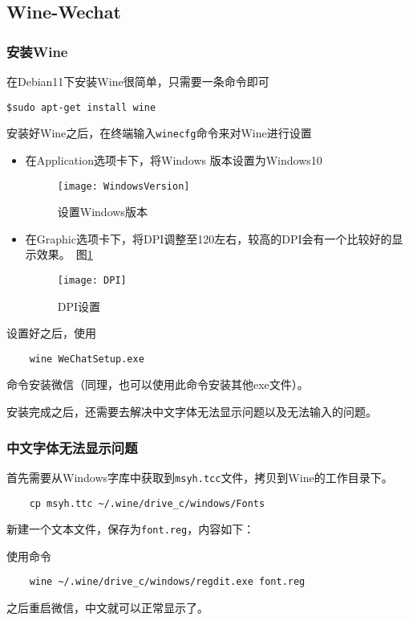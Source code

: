 \subsection{Wine-Wechat}
\subsubsection{安装Wine}
在Debian11下安装Wine很简单，只需要一条命令即可
\begin{lstlisting}
$sudo apt-get install wine
\end{lstlisting}

安装好Wine之后，在终端输入\lstinline|winecfg|命令来对Wine进行设置
\begin{itemize}
	\item 在Application选项卡下，将Windows 版本设置为Windows10
	\begin{figure}[htbp]
		\centering
		\texttt{[image: WindowsVersion]}
		\caption{设置Windows版本}
	\end{figure}
	\item 在Graphic选项卡下，将DPI调整至120左右，较高的DPI会有一个比较好的显示效果。~图\ref{dpi}
	\begin{figure}[htbp]
		\centering
		\texttt{[image: DPI]}
		\caption{DPI设置}\label{dpi}
	\end{figure}
\end{itemize}

设置好之后，使用
\begin{lstlisting}
	wine WeChatSetup.exe
\end{lstlisting}
命令安装微信（同理，也可以使用此命令安装其他exe文件）。

安装完成之后，还需要去解决中文字体无法显示问题以及无法输入的问题。

\subsubsection{中文字体无法显示问题}
首先需要从Windows字库中获取到\lstinline|msyh.tcc|文件，拷贝到Wine的工作目录下。
\begin{lstlisting}
	cp msyh.ttc ~/.wine/drive_c/windows/Fonts
\end{lstlisting}

新建一个文本文件，保存为\verb*|font.reg|，内容如下：


使用命令\begin{lstlisting}
	wine ~/.wine/drive_c/windows/regdit.exe font.reg
\end{lstlisting}
之后重启微信，中文就可以正常显示了。


